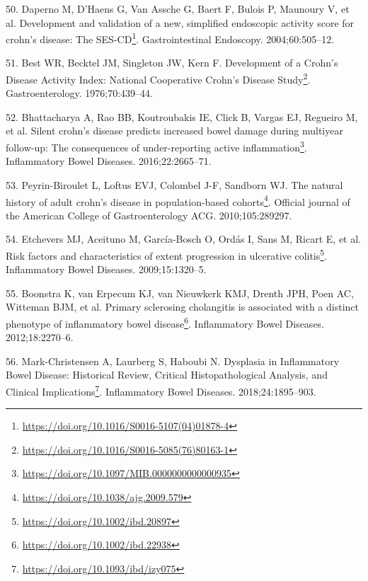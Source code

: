 \documentclass[
  a4paper,
]{book}
\DeclareRobustCommand{\href}[2]{#2\footnote{\url{#1}}}
\newlength{\cslhangindent}
\newlength{\cslentryspacingunit} %
\newenvironment{CSLReferences}[2] %
 {%
  \setlength{\parindent}{0pt}
  \ifodd #1
  \let\oldpar\par
  \def\par{\hangindent=\cslhangindent\oldpar}
  \fi
  \setlength{\parskip}{#2\cslentryspacingunit}
 }%
 {}
\begin{document}
\begin{CSLReferences}{0}{0}
\leavevmode{}%
50. Daperno M, D'Haens G, Van Assche G, Baert F, Bulois P, Maunoury V, et al. \href{https://doi.org/10.1016/S0016-5107(04)01878-4}{Development and validation of a new, simplified endoscopic activity score for crohn's disease: The SES-CD}. Gastrointestinal Endoscopy. 2004;60:505--12.

\leavevmode{}%
51. Best WR, Becktel JM, Singleton JW, Kern F. \href{https://doi.org/10.1016/S0016-5085(76)80163-1}{Development of a Crohn's Disease Activity Index: National Cooperative Crohn's Disease Study}. Gastroenterology. 1976;70:439--44.

\leavevmode{}%
52. Bhattacharya A, Rao BB, Koutroubakis IE, Click B, Vargas EJ, Regueiro M, et al. \href{https://doi.org/10.1097/MIB.0000000000000935}{Silent crohn's disease predicts increased bowel damage during multiyear follow-up: The consequences of under-reporting active inflammation}. Inflammatory Bowel Diseases. 2016;22:2665--71.

\leavevmode{}%
53. Peyrin-Biroulet L, Loftus EVJ, Colombel J-F, Sandborn WJ. \href{https://doi.org/10.1038/ajg.2009.579}{The natural history of adult crohn's disease in population-based cohorts}. Official journal of the American College of Gastroenterology \textbar{} ACG. 2010;105:289297.

\leavevmode{}%
54. Etchevers MJ, Aceituno M, García-Bosch O, Ordás I, Sans M, Ricart E, et al. \href{https://doi.org/10.1002/ibd.20897}{Risk factors and characteristics of extent progression in ulcerative colitis}. Inflammatory Bowel Diseases. 2009;15:1320--5.

\leavevmode{}%
55. Boonstra K, van Erpecum KJ, van Nieuwkerk KMJ, Drenth JPH, Poen AC, Witteman BJM, et al. \href{https://doi.org/10.1002/ibd.22938}{Primary sclerosing cholangitis is associated with a distinct phenotype of inflammatory bowel disease}. Inflammatory Bowel Diseases. 2012;18:2270--6.

\leavevmode{}%
56. Mark-Christensen A, Laurberg S, Haboubi N. \href{https://doi.org/10.1093/ibd/izy075}{Dysplasia in Inflammatory Bowel Disease: Historical Review, Critical Histopathological Analysis, and Clinical Implications}. Inflammatory Bowel Diseases. 2018;24:1895--903.


\end{CSLReferences}
\end{document}
